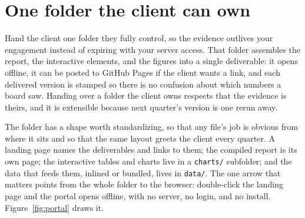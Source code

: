 \documentclass[
    a4paper,
    fontsize=10pt,
    twoside=true,
    numbers=noenddot,
]{kaobook}
\begin{document}
\section{One folder the client can own}
Hand the client one folder they fully control, so the evidence outlives your engagement instead of expiring with your server access. That folder assembles the report, the interactive elements, and the figures into a single deliverable: it opens offline, it can be posted to GitHub Pages if the client wants a link, and each delivered version is stamped so there is no confusion about which numbers a board saw. Handing over a folder the client owns respects that the evidence is theirs, and it is extensible because next quarter's version is one rerun away.

The folder has a shape worth standardizing, so that any file's job is obvious from where it sits and so that the same layout greets the client every quarter. A landing page names the deliverables and links to them; the compiled report is its own page; the interactive tables and charts live in a \texttt{charts/} subfolder; and the data that feeds them, inlined or bundled, lives in \texttt{data/}. The one arrow that matters points from the whole folder to the browser: double-click the landing page and the portal opens offline, with no server, no login, and no install. Figure~\ref{fig:portal} draws it.
\end{document}
